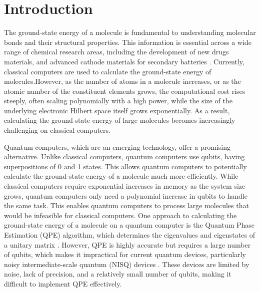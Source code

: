 \documentclass[pdflatex,sn-mathphys-num]{sn-jnl}%
\theoremstyle{thmstyleone}%
\theoremstyle{thmstyletwo}%
\theoremstyle{thmstylethree}%
\begin{document}
\section{Introduction}\label{sec1}
The ground-state energy of a molecule is fundamental to understanding molecular bonds and their structural properties. This information is essential across a wide range of chemical research areas, including the development of new drugs materials\cite{DRUG1, DRUG2}, and advanced cathode materials for secondary batteries \cite{BAT1,BAT2}. Currently, classical computers are used to calculate the ground-state energy of molecules.However, as the number of atoms in a molecule increases, or as the atomic number of the constituent elements grows, the computational cost rises steeply, often scaling polynomially with a high power\cite{CLACOM1,CLACOM2}, while the size of the underlying electronic Hilbert space itself grows exponentially\cite{FCIDIM1}. As a result, calculating the ground-state energy of large molecules becomes increasingly challenging on classical computers.

Quantum computers, which are an emerging technology, offer a promising alternative. Unlike classical computers, quantum computers use qubits, having superpositions of 0 and 1 states. This allows quantum computers to potentially calculate the ground-state energy of a molecule much more efficiently. While classical computers require exponential increases in memory as the system size grows, quantum computers only need a polynomial increase in qubits to handle the same task. This enables quantum computers to process large molecules that would be infeasible for classical computers. One approach to calculating the ground-state energy of a molecule on a quantum computer is the Quantum Phase Estimation (QPE) algorithm, which determines the eigenvalues and eigenstates of a unitary matrix \cite{QPE1,QPE2,QPE3,QPE4,QPE5}. However, QPE is highly accurate but requires a large number of qubits, which makes it impractical for current quantum devices, particularly noisy intermediate-scale quantum (NISQ) devices \cite{NISQ1}. These devices are limited by noise, lack of precision, and a relatively small number of qubits, making it difficult to implement QPE effectively.
\end{document}
